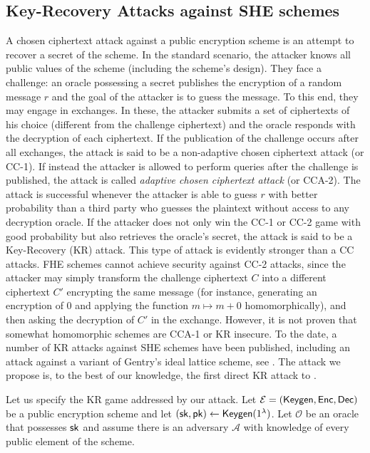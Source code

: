 \documentclass[11pt]{article}
\theoremstyle{plain}
\theoremstyle{definition}
\theoremstyle{remark}
\newcommand{\sk}{{\sf sk}}
\newcommand{\pk}{{\sf pk}}
\newcommand{\Dec}{{\sf Dec}}
\newcommand{\Enc}{{\sf Enc}}
\newcommand{\KeyGen}{{\sf Keygen}}
\begin{document}
\subsection{Key-Recovery Attacks against SHE schemes}
A chosen ciphertext attack against a public encryption scheme is an attempt to recover a secret of the scheme. In the standard scenario, the attacker knows all public values of the scheme (including the scheme's design). They face a challenge: an oracle possessing a secret publishes the encryption of a random message $r$ and the goal of the attacker is to guess the message. To this end, they may engage in exchanges. In these, the attacker submits a set of ciphertexts of his choice (different from the challenge ciphertext) and the oracle responds with the decryption of each ciphertext. If the publication of the challenge occurs after all exchanges, the attack is said to be a non-adaptive chosen ciphertext attack (or CC-1). If instead the attacker is allowed to perform queries after the challenge is published, the attack is called {\it adaptive chosen ciphertext attack} (or CCA-2). The attack is successful whenever the attacker is able to guess $r$ with better probability than a third party who guesses the plaintext without access to any decryption oracle. %
If the attacker does not only win the CC-1 or CC-2 game with good probability but also retrieves the oracle's secret, the attack is said to be a Key-Recovery (KR) attack. This type of attack is evidently stronger than a CC attacks. FHE schemes cannot achieve security against CC-2 attacks, since the attacker may simply transform the challenge ciphertext $C$ into a different ciphertext $C'$ encrypting the same message (for instance, generating an encryption of 0 and applying the function $m\mapsto m+0$ homomorphically), and then asking the decryption of $C'$ in the exchange. However, it is not proven that somewhat homomorphic schemes are CCA-1 or KR insecure. To the date, a number of KR attacks against SHE schemes have been published, including an attack against a variant of Gentry's ideal lattice scheme, see \cite{Loftus:2011:CSH:2186839.2186845}. The attack we propose is, to the best of our knowledge, the first direct KR attack to \cite{Gentry:2009:FHE:1536414.1536440}.
\medskip 

Let us specify the KR game addressed by our attack. Let $\mathcal E=(\KeyGen,\Enc,\Dec)$ be a public encryption scheme and let $(\sk,\pk)\leftarrow \KeyGen(1^\lambda)$. Let $\mathcal O$ be an oracle that possesses $\sk$ and assume there is an adversary $\mathcal{A}$ with knowledge of every public element of the scheme.
\medskip
\end{document}
